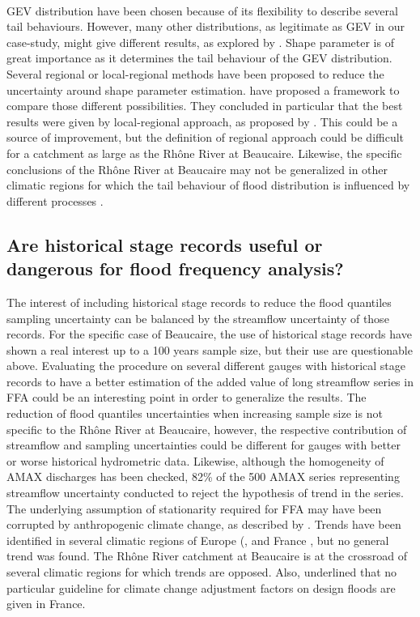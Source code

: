 \documentclass[11pt]{article}
\begin{document}
    \paragraph{}
    GEV distribution have been chosen because of its flexibility to describe several tail behaviours. However, many other distributions, as legitimate as GEV in our case-study, might give different results, as explored by \citet{kochanek_data-based_2014}. Shape parameter is of great importance as it determines the tail behaviour of the GEV distribution. Several regional or local-regional methods have been proposed to reduce the uncertainty around shape parameter estimation. \citet{renard_data-based_2013} have proposed a framework to compare those different possibilities. They concluded in particular that the best results were given by local-regional approach, as proposed by \citet{ribatet_regional_2007}. This could be a source of improvement, but the definition of regional approach could be difficult for a catchment as large as the Rhône River at Beaucaire. Likewise, the specific conclusions of the Rhône River at Beaucaire may not be generalized in other climatic regions for which the tail behaviour of flood distribution is influenced by different processes \citep{merz_understanding_2022}.

    \subsection{Are historical stage records useful or dangerous for flood frequency analysis?}

    The interest of including historical stage records to reduce the flood quantiles sampling uncertainty can be balanced by the streamflow uncertainty of those records. For the specific case of Beaucaire, the use of historical stage records have shown a real interest up to a 100 years sample size, but their use are questionable above. Evaluating the procedure on several different gauges with historical stage records to have a better estimation of the added value of long streamflow series in FFA could be an interesting point in order to generalize the results. The reduction of flood quantiles uncertainties when increasing sample size is not specific to the Rhône River at Beaucaire, however, the respective contribution of streamflow and sampling uncertainties could be different for gauges with better or worse historical hydrometric data. 
    Likewise, although the homogeneity of AMAX discharges has been checked, 82\% of the 500 AMAX series representing streamflow uncertainty conducted to reject the hypothesis of trend in the series. The underlying assumption of stationarity required for FFA may have been corrupted by anthropogenic climate change, as described by \citet{milly_stationarity_2008}. Trends have been identified in several climatic regions of Europe (\citet{hall_understanding_2014}, \citet{bloschl_changing_2017} and France \citep{renard_regional_2008}, but no general trend was found. The Rhône River catchment at Beaucaire is at the crossroad of several climatic regions for which trends are opposed. Also, \citet{madsen_review_2014} underlined that no particular guideline for climate change adjustment factors on design floods are given in France. 
\end{document}
